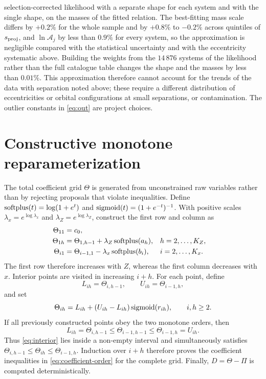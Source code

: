 selection-corrected likelihood with a separate shape for each system and with
the single shape, on the masses of the fitted relation.  The best-fitting
mass scale differs by $+0.2\%$ for the whole sample and by $+0.8\%$ to $-0.2\%$
across quintiles of $s_{\rm proj}$, and $\ln\mathcal A_j$ by less than
$0.9\%$ for every system, so the approximation is negligible compared with the
statistical uncertainty and with the eccentricity systematic above.  Building
the weights from the $14\,876$ systems of the likelihood rather than the full
catalogue table changes the shape and the masses by less than $0.01\%$.  This
approximation therefore cannot account for the trends of the data with
separation noted above; these require a different distribution of
eccentricities or orbital configurations at small separations, or contamination.
The outlier constants in \cref{eq:out} are project choices.


\section{Constructive monotone reparameterization}
\label{app:monotone}

The total coefficient grid $\Theta$ is generated from unconstrained raw
variables rather than by rejecting proposals that violate inequalities.  Define
$\operatorname{softplus}(t)=\log(1+e^t)$ and
$\operatorname{sigmoid}(t)=(1+e^{-t})^{-1}$.  With positive scales
$\lambda_x=e^{\log\lambda_x}$ and $\lambda_Z=e^{\log\lambda_Z}$, construct the
first row and column as
\begin{align}
 \Theta_{11}&=c_0,\\
 \Theta_{1h}&=\Theta_{1,h-1}+\lambda_Z\operatorname{softplus}(a_h),
 &&h=2,\ldots,K_Z,\\
 \Theta_{i1}&=\Theta_{i-1,1}-\lambda_x\operatorname{softplus}(b_i),
 &&i=2,\ldots,K_x.
 \label{eq:boundaries}
\end{align}
The first row therefore increases with $Z$, whereas the first column decreases
with $x$.  Interior points are visited in increasing $i+h$.  For each point,
define
\begin{equation}
 L_{ih}=\Theta_{i,h-1},\qquad U_{ih}=\Theta_{i-1,h},
\end{equation}
and set
\begin{equation}
 \Theta_{ih}=L_{ih}+(U_{ih}-L_{ih})\operatorname{sigmoid}(r_{ih}),
 \qquad i,h\ge2.
 \label{eq:interior}
\end{equation}
If all previously constructed points obey the two monotone orders, then
\begin{equation}
 L_{ih}=\Theta_{i,h-1}\le\Theta_{i-1,h-1}\le
 \Theta_{i-1,h}=U_{ih}.
\end{equation}
Thus \cref{eq:interior} lies inside a non-empty interval and simultaneously
satisfies
$\Theta_{i,h-1}\le\Theta_{ih}\le\Theta_{i-1,h}$.  Induction over $i+h$
therefore proves the coefficient inequalities in \cref{eq:coefficient-order}
for the complete grid.  Finally, $D=\Theta-\Pi$ is computed deterministically.

